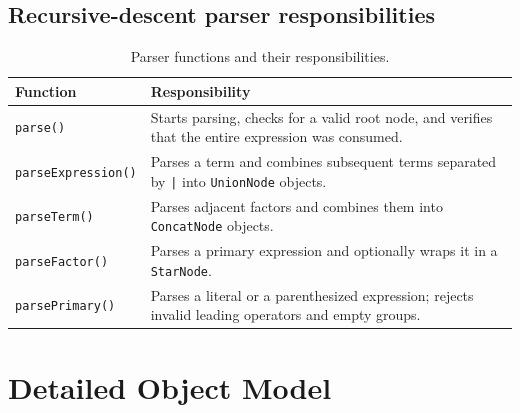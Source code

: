 \documentclass[12pt,a4paper]{report}
\begin{document}
\subsection{Recursive-descent parser responsibilities}
\begin{table}[htbp]
\centering
\caption{Parser functions and their responsibilities.}
\begin{tabular}{|l|p{9.5cm}|}
\hline
\textbf{Function} & \textbf{Responsibility} \\
\hline
\texttt{parse()} & Starts parsing, checks for a valid root node, and verifies that the entire expression was consumed. \\
\hline
\texttt{parseExpression()} & Parses a term and combines subsequent terms separated by \texttt{|} into \texttt{UnionNode} objects. \\
\hline
\texttt{parseTerm()} & Parses adjacent factors and combines them into \texttt{ConcatNode} objects. \\
\hline
\texttt{parseFactor()} & Parses a primary expression and optionally wraps it in a \texttt{StarNode}. \\
\hline
\texttt{parsePrimary()} & Parses a literal or a parenthesized expression; rejects invalid leading operators and empty groups. \\
\hline
\end{tabular}
\end{table}

\section{Detailed Object Model}
\end{document}
